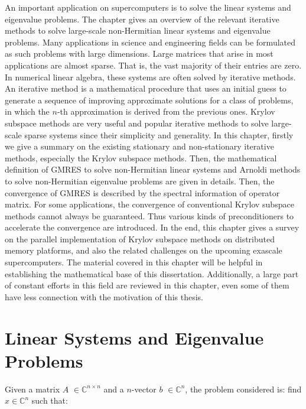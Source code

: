 \begin{displayquote}
	\textsf{An important application on supercomputers is to solve the linear systems and eigenvalue problems. The chapter gives an overview of the relevant iterative methods to solve large-scale non-Hermitian linear systems and eigenvalue problems. Many applications in science and engineering fields can be formulated as such problems with large dimensions.  Large matrices that arise in most applications are almost sparse. That is, the vast majority of their entries are zero. In numerical linear algebra, these systems are often solved by iterative methods. An iterative method is a mathematical procedure that uses an initial guess to generate a sequence of improving approximate solutions for a class of problems, in which the $n$-th approximation is derived from the previous ones. Krylov subspace methods are very useful and popular iterative methods to solve large-scale sparse systems since their simplicity and generality. In this chapter, firstly we give a summary on the existing stationary and non-stationary iterative methods, especially the Krylov subspace methods. Then, the mathematical definition of GMRES to solve non-Hermitian linear systems and Arnoldi methods to solve non-Hermitian eigenvalue problems are given in details. Then, the convergence of GMRES is described by the spectral information of operator matrix. For some applications, the convergence of conventional Krylov subspace methods cannot always be guaranteed. Thus various kinds of preconditioners to accelerate the convergence are introduced. In the end, this chapter gives a survey on the parallel implementation of Krylov subspace methods on distributed memory platforms, and also the related challenges on the upcoming exascale supercomputers. The material covered in this chapter will be helpful in establishing the mathematical base of this dissertation. Additionally, a large part of constant efforts in this field are reviewed in this chapter, even some of them have less connection with the motivation of this thesis.}
\end{displayquote}

\vspace{0.6in}

\section{Linear Systems and Eigenvalue Problems}

Given a matrix $A$ $\in \mathbb{C}^{n \times n}$ and a $n$-vector $b$ $\in \mathbb{C}^{n}$, the problem considered is: find $x \in \mathbb{C}^{n}$ such that:

